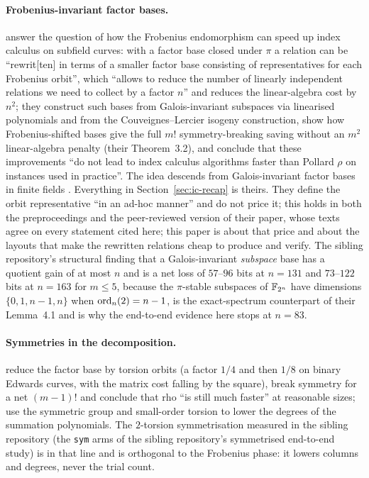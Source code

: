 \paragraph{Frobenius-invariant factor bases.}
\citet{ggmp2020} answer the question of how the Frobenius endomorphism
can speed up index calculus on subfield curves: with a factor base
closed under $\pi$ a relation can be ``rewrit[ten] in terms of a smaller
factor base consisting of representatives for each Frobenius orbit'',
which ``allows to reduce the number of linearly independent relations we
need to collect by a factor $n$'' and reduces the linear-algebra cost by
$n^2$; they construct such bases from Galois-invariant subspaces via
linearised polynomials and from the Couveignes--Lercier isogeny
construction, show how Frobenius-shifted bases give the full $m!$
symmetry-breaking saving without an $m^2$ linear-algebra penalty
(their Theorem~3.2), and conclude that these improvements ``do not lead
to index calculus algorithms faster than Pollard $\rho$ on instances
used in practice''. The idea descends from Galois-invariant factor
bases in finite fields \citep{jouxlercier2006}. Everything in
Section~\ref{sec:ic-recap} is theirs. They define the orbit
representative ``in an ad-hoc manner'' and do not price it; this holds
in both the preproceedings and the peer-reviewed version of their
paper, whose texts agree on every statement cited here; this paper
is about that price and about the layouts that make the rewritten
relations cheap to produce and verify. The sibling repository's
structural finding that a Galois-invariant \emph{subspace} base has a
quotient gain of at most $n$ and is a net loss of $57$--$96$ bits at
$n=131$ and $73$--$122$ bits at $n=163$ for $m\le5$, because the
$\pi$-stable subspaces of $\mathbb{F}_{2^n}$ have dimensions
$\{0,1,n-1,n\}$ when $\operatorname{ord}_n(2)=n-1$, is the exact-spectrum
counterpart of their Lemma~4.1 and is why the end-to-end evidence here
stops at $n=83$.

\paragraph{Symmetries in the decomposition.}
\citet{gg2014} reduce the factor base by torsion orbits (a factor $1/4$
and then $1/8$ on binary Edwards curves, with the matrix cost falling
by the square), break symmetry for a net $(m-1)!$ and conclude that rho
``is still much faster'' at reasonable sizes;
\citet{fghr2014,fhjrv2014} use the symmetric group and small-order
torsion to lower the degrees of the summation polynomials. The
$2$-torsion symmetrisation measured in the sibling repository
(the \texttt{sym} arms of the sibling repository's symmetrised
end-to-end study) is in that line and is orthogonal to the Frobenius phase: it
lowers columns and degrees, never the trial count.

